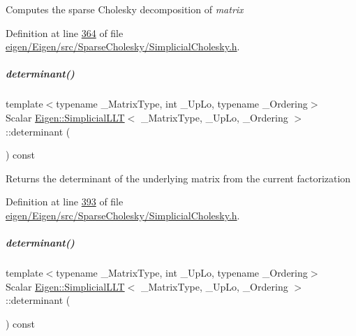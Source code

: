 Computes the sparse Cholesky decomposition of {\itshape matrix} 

Definition at line \hyperlink{eigen_2_eigen_2src_2_sparse_cholesky_2_simplicial_cholesky_8h_source_l00364}{364} of file \hyperlink{eigen_2_eigen_2src_2_sparse_cholesky_2_simplicial_cholesky_8h_source}{eigen/\+Eigen/src/\+Sparse\+Cholesky/\+Simplicial\+Cholesky.\+h}.

\mbox{\label{group___sparse_cholesky___module_a956595848e6fac7a389d091b3fdc9567}} 
\subparagraph{\texorpdfstring{determinant()}{determinant()}\hspace{0.1cm}{\footnotesize\ttfamily [1/2]}}
{\footnotesize\ttfamily template$<$typename \+\_\+\+Matrix\+Type, int \+\_\+\+Up\+Lo, typename \+\_\+\+Ordering$>$ \\
Scalar \hyperlink{group___sparse_cholesky___module_class_eigen_1_1_simplicial_l_l_t}{Eigen\+::\+Simplicial\+L\+LT}$<$ \+\_\+\+Matrix\+Type, \+\_\+\+Up\+Lo, \+\_\+\+Ordering $>$\+::determinant (\begin{DoxyParamCaption}{ }\end{DoxyParamCaption}) const\hspace{0.3cm}{\ttfamily [inline]}}

\begin{DoxyReturn}{Returns}
the determinant of the underlying matrix from the current factorization 
\end{DoxyReturn}


Definition at line \hyperlink{eigen_2_eigen_2src_2_sparse_cholesky_2_simplicial_cholesky_8h_source_l00393}{393} of file \hyperlink{eigen_2_eigen_2src_2_sparse_cholesky_2_simplicial_cholesky_8h_source}{eigen/\+Eigen/src/\+Sparse\+Cholesky/\+Simplicial\+Cholesky.\+h}.

\mbox{\label{group___sparse_cholesky___module_a956595848e6fac7a389d091b3fdc9567}} 
\subparagraph{\texorpdfstring{determinant()}{determinant()}\hspace{0.1cm}{\footnotesize\ttfamily [2/2]}}
{\footnotesize\ttfamily template$<$typename \+\_\+\+Matrix\+Type, int \+\_\+\+Up\+Lo, typename \+\_\+\+Ordering$>$ \\
Scalar \hyperlink{group___sparse_cholesky___module_class_eigen_1_1_simplicial_l_l_t}{Eigen\+::\+Simplicial\+L\+LT}$<$ \+\_\+\+Matrix\+Type, \+\_\+\+Up\+Lo, \+\_\+\+Ordering $>$\+::determinant (\begin{DoxyParamCaption}{ }\end{DoxyParamCaption}) const\hspace{0.3cm}{\ttfamily [inline]}}

